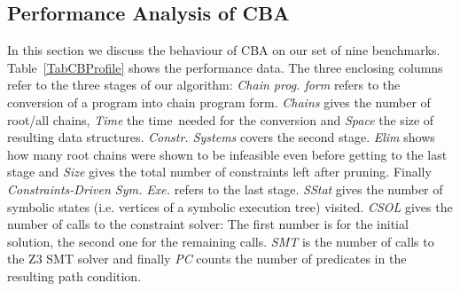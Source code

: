 \documentclass{llncs}
\newcommand{\CBATool}{\textsc{CBA}\xspace}
\begin{document}
\subsection{Performance Analysis of \CBATool}
\label{sec:Perform}

In this section we discuss the behaviour of \CBATool on our set of nine
benchmarks. Table~\ref{TabCBProfile} shows the performance data. The three
enclosing columns refer to the three stages of our algorithm: \emph{Chain
  prog. form} refers to the conversion of a program into chain program
form. \emph{Chains} gives the number of root/all chains, \emph{Time} the
time\ needed for the conversion and \emph{Space} the size of resulting data
structures. \emph{Constr. Systems} covers the second stage.
\emph{Elim} shows how many root chains were shown to be
infeasible even before getting to the last stage and \emph{Size} gives the
total number of constraints left after pruning. Finally
\emph{Constraints-Driven Sym. Exe.} refers to the last stage.
\emph{SStat} gives the number of symbolic states (i.e. vertices of a
symbolic execution tree) visited. \emph{CSOL} gives the number of calls to
the constraint solver: The first number is for the initial solution, the
second one for the remaining calls. \emph{SMT} is the number of calls to the
Z3 SMT solver and finally \emph{PC} counts the number of predicates in the
resulting path condition. 
\end{document}
